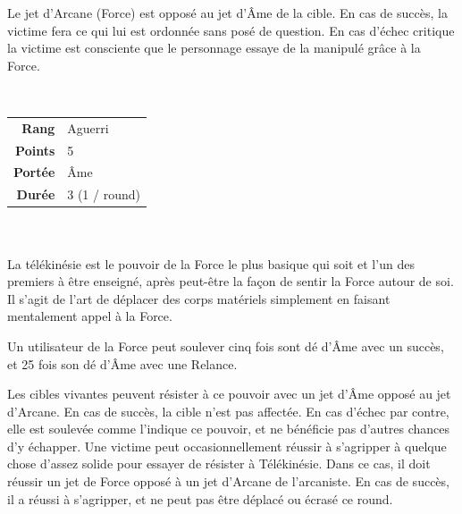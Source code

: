 \begin{description}[align=left]
		Le jet d’Arcane (Force) est opposé au jet d’\^Ame de la cible. En cas de succès, la victime fera ce qui lui est ordonnée sans posé de question. En cas d’échec critique la victime est consciente que le personnage essaye de la manipulé grâce à la Force.
        \\

    \item [Télékinésie] ~ \\

        \begin{tabular}{ r l }
            \textbf{Rang}    & Aguerri \\
            \textbf{Points}  & 5 \\
            \textbf{Portée}  & \^Ame \\
            \textbf{Durée}   & 3 (1 / round) \\
        \end{tabular}
        \\ \\
        La télékinésie est le pouvoir de la Force le plus basique qui soit et l’un des premiers à être enseigné, après peut-être la façon de sentir la Force autour de soi. Il s’agit de l’art de déplacer des corps matériels simplement en faisant mentalement appel à la Force.

        Un utilisateur de la Force peut soulever cinq fois sont dé d’\^Ame avec un succès, et 25 fois son dé d’\^Ame avec une Relance.

        Les cibles vivantes peuvent résister à ce pouvoir avec un jet d’\^Ame opposé au jet d’Arcane. En cas de succès, la cible n’est pas affectée. En cas d’échec par contre, elle est soulevée comme l’indique ce pouvoir, et ne bénéficie pas d’autres chances d’y échapper. Une victime peut occasionnellement réussir à s’agripper à quelque chose d’assez solide pour essayer de résister à Télékinésie. Dans ce cas, il doit réussir un jet de Force opposé à un jet d’Arcane de l’arcaniste. En cas de succès, il a réussi à s’agripper, et ne peut pas être déplacé ou écrasé ce round.
        \\

    \item [Télépathie] ~ \\


\end{description}

